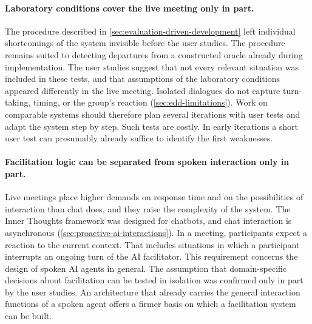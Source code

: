 \paragraph{Laboratory conditions cover the live meeting only in part.}
The procedure described in \autoref{sec:evaluation-driven-development} left
individual shortcomings of the system invisible before the user studies.
The procedure remains suited to detecting departures from a constructed oracle
already during implementation.
The user studies suggest that not every relevant situation was included in
these tests, and that assumptions of the laboratory conditions appeared
differently in the live meeting.
Isolated dialogues do not capture turn-taking, timing, or the group's reaction
(\autoref{sec:edd-limitations}).
Work on comparable systems should therefore plan several iterations with user
tests and adapt the system step by step.
Such tests are costly.
In early iterations a short user test can presumably already suffice to
identify the first weaknesses.

\paragraph{Facilitation logic can be separated from spoken interaction only in part.}
Live meetings place higher demands on response time and on the possibilities
of interaction than chat does, and they raise the complexity of the system.
The Inner Thoughts framework was designed for chatbots, and chat interaction
is asynchronous
(\autoref{sec:proactive-ai-interactions}).
In a meeting, participants expect a reaction to the current context.
That includes situations in which a participant interrupts an ongoing turn of
the AI facilitator.
This requirement concerns the design of spoken AI agents in general.
The assumption that domain-specific decisions about facilitation can be tested
in isolation was confirmed only in part by the user studies.
An architecture that already carries the general interaction functions of a
spoken agent offers a firmer basis on which a facilitation system can be built.
